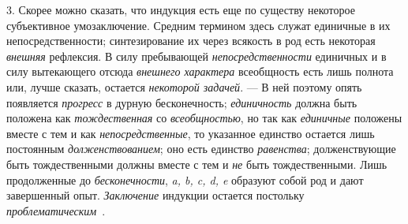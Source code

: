\documentclass[twoside]{article}
\begin{document}
{{{{{3. Скорее можно сказать, что индукция есть еще по существу
некоторое субъективное умозаключение. Средним термином здесь служат
единичные в их непосредственности; синтезирование их через всякость в род
есть некоторая {\em внешняя}
рефлексия. В силу пребывающей
{\em непосредственности}
единичных и в силу вытекающего отсюда
{\em внешнего характера}
всеобщность есть лишь полнота или, лучше
сказать, остается {\em некоторой
задачей}. — В ней поэтому опять появляется
{\em прогресс} в дурную
бесконечность; {\em единичность}
должна быть положена как
{\em тождественная} со
{\em всеобщностью}, но
так как {\em единичные}
положены вместе с тем и как
{\em непосредственные},
то указанное единство остается лишь постоянным
{\em долженствованием};
оно есть единство
{\em равенства};
долженствующие быть тождественными должны вместе с тем и
{\em не} быть
тождественными. Лишь продолженные до
{\em бесконечности},
{\em a, b, c, d, e} образуют собой род и
дают завершенный опыт. {\em Заключение}
индукции остается постольку
{\em проблематическим}~\label{bkm:bm58}.

}}}}}
\end{document}
